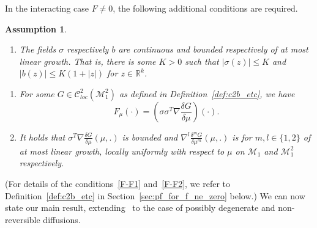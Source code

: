 \documentclass{article}
\newcommand{\R}{\mathbb{R}}
\newcommand{\F}{F}
\newcommand{\C}{\mathcal C}
\newcommand{\cM}{\mathcal M}
\newtheorem{assumption}[theorem]{Assumption}
\begin{document}
In the interacting case $\F\neq0$, the following additional conditions are required.
\begin{assumption}
\label{assumption:interaction} 
 \begin{enumerate}[label=(L.{\arabic*})] \addtocounter{enumi}{4}
 \item \label{interact.L} The fields $\sigma$ respectively $b$ are continuous and bounded respectively of at
   most linear growth. That is, there is some $K>0$ such that $|\sigma(z)|\leq K$ and $|b(z)|\leq K(1+|z|)$
   for $z \in \R^k$.
\end{enumerate}
\begin{enumerate}[label=(F.{\arabic*})]
\item \label{F-F1} %
  For some $G \in \C^2_{loc}(\cM_1^2)$ as defined in Definition~\ref{def:c2b_etc}, we have
  \begin{equation*}
    F_\mu(\cdot) = \left(\sigma \sigma^T\nabla\frac {\delta G }{\delta \mu}\right)(\cdot).
  \end{equation*}
\item \label{F-F2} It holds that $\sigma^ T\nabla \frac {\delta G}{\delta \mu}(\mu,.)$ is bounded and
  $\nabla^l \frac{\delta^m G}{\delta \mu^m}(\mu,.)$ is for
  $m,l\in \{1,2\}$ of at most linear growth, locally uniformly with respect to $\mu$ on $\cM_1$ and
  $\cM^2_1$ respectively.
\end{enumerate}
\end{assumption}
(For details of the conditions~\ref{F-F1} and~\ref{F-F2}, we refer to Definition~\ref{def:c2b_etc} in
Section~\ref{sec:pf_for_f_ne_zero} below.) We can now state our main result, extending~\cite{Konarovskyi2019a,
  Konarovskyi2020a} to the case of possibly degenerate and non-reversible diffusions.
\end{document}
